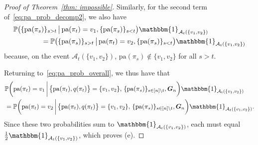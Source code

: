 \documentclass[twoside,11pt]{article}
\theoremstyle{remark}
\begin{document}
\begin{proof}[Proof of Theorem~\ref{thm: impossible}]
Similarly, for the second term of~\eqref{eq:pa_prob_decomp2}, we also have
\begin{align*}
&\mathbb{P}\bigl( \{\text{pa}(\pi_s)\}_{s>t} \,\big|\, \text{pa}(\pi_t) = v_1, \{\text{pa}(\pi_s)\}_{s<t}\bigr)\mathbbm{1}_{\mathcal{A}_t(\{v_1, v_2\})}\\
& \qquad \qquad = \mathbb{P}\bigl( \{\text{pa}(\pi_s)\}_{s>t} \,\big|\, \text{pa}(\pi_t) = v_2, \{\text{pa}(\pi_s)\}_{s<t}\bigr)\mathbbm{1}_{\mathcal{A}_t(\{v_1, v_2\})}
\end{align*}
because, on the event $\mathcal{A}_t(\{v_1, v_2\})$, $\text{pa}(\pi_s) \notin \{v_1, v_2\}$ for all $s > t$. 

Returning to~\eqref{eq:pa_prob_overall}, we thus have that
%
\begin{equation*}
\begin{aligned}
&\mathbb{P}\biggl(\text{pa}(\pi_t) = v_1 \,\bigg| \left\{\operatorname{pa}(\pi_t), q(\pi_t)\right\}=\{v_1, v_2\},\, \{\text{pa}(\pi_s)\}_{s \in [n]\backslash{t}}, \bm{G}_n \biggr) \mathbbm{1}_{\mathcal{A}_t(\{v_1, v_2\})} \\
&=\mathbb{P}\biggl(\text{pa}(\pi_t) = v_2 \,\bigg| \left\{\operatorname{pa}(\pi_t), q(\pi_t)\right\}=\{v_1, v_2\},\, \{\text{pa}(\pi_s)\}_{s \in [n]\backslash{t}}, \bm{G}_n \biggr) \mathbbm{1}_{\mathcal{A}_t(\{v_1, v_2\})} .    
\end{aligned}
\end{equation*}
%
Since these two probabilities sum to $\mathbbm{1}_{\mathcal{A}_t(\{v_1, v_2\})}$, each must equal $\frac{1}{2} \mathbbm{1}_{\mathcal{A}_t(\{v_1, v_2\})}$, which proves (e).




\end{proof}
\end{document}
